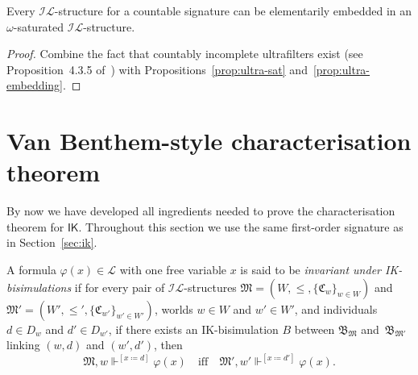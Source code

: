 \documentclass[submission,copyright,creativecommons]{eptcs}
\newcommand{\mo}{\mathfrak}
\newcommand{\B}{\mo{B}}
\renewcommand{\phi}{\varphi}
\renewcommand{\iff}{\quad\text{iff}\quad}
\newcommand{\IL}{\mathscr{I\!\!L}}   %
\newcommand{\LL}{\mathcal{L}}        %
\newcommand{\IK}{\mathsf{IK}}
\newcommand{\satisfySym}{\Vdash}
\newcommand{\satisfy}[4]{#1, #2 \satisfySym^{#4} #3}
\begin{document}
\begin{theorem}\label{thm:ultra-embedding}
  Every $\IL$-structure for a countable signature can be elementarily embedded in an $\omega$-saturated $\IL$-structure.
\end{theorem}
\begin{proof}
  Combine the fact that countably incomplete ultrafilters exist (see Proposition~4.3.5 of~\cite{ChaKei73})
  with Propositions~\ref{prop:ultra-sat} and~\ref{prop:ultra-embedding}.
\end{proof}



\section{Van Benthem-style characterisation theorem}
\label{sec:vbtheorem}

  By now we have developed all ingredients needed to prove the characterisation
  theorem for $\IK$. 
  Throughout this section we use the same first-order signature as in Section~\ref{sec:ik}.

\begin{definition}
  A formula $\phi(x) \in \LL$ with one free variable $x$ is said to be
  \emph{invariant under IK-bi\-si\-mu\-la\-tions} if for every pair of $\IL$-structures
  $\mo{M} = (W, \leq, \{ \mo{C}_w \}_{w \in W})$ and
  $\mo{M}' = (W', \leq', \{ \mo{C}_{w'} \}_{w' \in W'})$,
  worlds $w \in W$ and $w'\in W'$, and individuals $d \in D_w$ and $d'\in D_{w'}$, if there exists an IK-bi\-si\-mu\-la\-tion $B$ between $\B_{\mo{M}}$ and~$\B_{\mo{M}'}$
  linking $(w, d)$ and $(w', d')$, then
  \begin{equation*}
    \satisfy{\mo{M}}{w}{\phi(x)}{[x \coloneq d]}
      \iff \satisfy{\mo{M}'}{w'}{\phi(x)}{[x \coloneq d']}.
  \end{equation*}
\end{definition}
\end{document}
